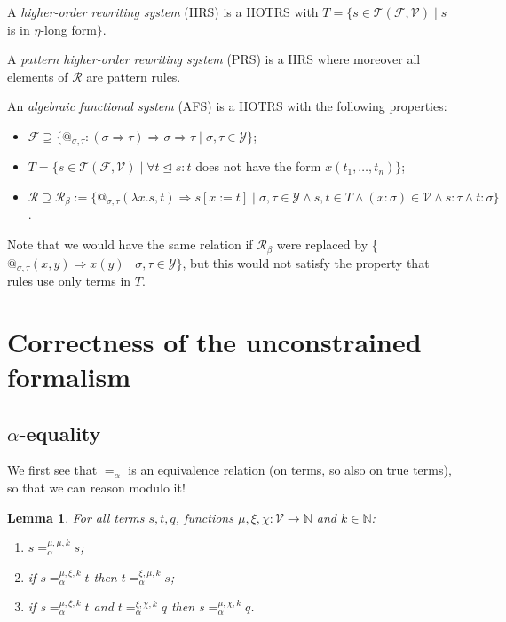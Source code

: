 \documentclass{lmcs}
\theoremstyle{theorem}\newtheorem{theorem}{Theorem}
\theoremstyle{theorem}\newtheorem{lemma}[theorem]{Lemma}
\theoremstyle{theorem}\newtheorem{corollary}[theorem]{Corollary}
\theoremstyle{definition}\newtheorem{definition}[theorem]{Definition}
\theoremstyle{definition}\newtheorem{example}[theorem]{Example}
\newcommand{\N}{\mathbb{N}}
\newcommand{\F}{\mathcal{F}}
\newcommand{\V}{\mathcal{V}}
\newcommand{\Types}{\mathcal{Y}}
\newcommand{\Terms}{\mathcal{T}}
\newcommand{\Rules}{\mathcal{R}}
\newcommand{\avar}{x}
\newcommand{\bvar}{y}
\newcommand{\abs}[2]{\lambda #1.#2}
\newcommand{\arrtype}{\Rightarrow}
\newcommand{\arrz}{\Rightarrow}
\newcommand{\subtermeq}{\unlhd}
\begin{document}
A \emph{higher-order rewriting system} (HRS) is a HOTRS with $T = \{ s \in \Terms(\F,\V) \mid s$
is in $\eta$-long form$\}$.

A \emph{pattern higher-order rewriting system} (PRS) is a HRS where moreover all elements of
$\Rules$ are pattern rules.

An \emph{algebraic functional system} (AFS) is a HOTRS with the following properties:
\begin{itemize}
\item $\F \supseteq \{ @_{\sigma,\tau} : (\sigma \arrtype \tau) \arrtype \sigma \arrtype \tau
  \mid \sigma,\tau \in \Types \}$;
\item $T = \{ s \in \Terms(\F,\V) \mid \forall t \subtermeq s: t$ does not have the form
  $\avar(t_1,\dots,t_n)\}$;
\item $\Rules \supseteq \Rules_\beta := \{ @_{\sigma,\tau}(\abs{\avar}{s},t) \arrz s[\avar:=t] \mid
  \sigma,\tau \in \Types \wedge s,t \in T \wedge (\avar : \sigma) \in \V \wedge s : \tau \wedge
  t : \sigma \}$.
\end{itemize}
Note that we would have the same relation if $\Rules_\beta$ were replaced by \{
$@_{\sigma,\tau}(\avar,\bvar) \arrz \avar(\bvar) \mid \sigma,\tau \in \Types \}$, but this would not
satisfy the property that rules use only terms in $T$.

\newpage\appendix

\section{Correctness of the unconstrained formalism}

\subsection{$\alpha$-equality}

We first see that $=_\alpha$ is an equivalence relation (on terms, so also on true terms), so that
we can reason modulo it!

\begin{lemma}\label{lem:alphaequiv}
For all terms $s,t,q$, functions $\mu,\xi,\chi : \V \to \N$ and $k \in \N$:
\begin{enumerate}
\item\label{lem:alphaequiv:reflexive}
  $s =_\alpha^{\mu,\mu,k} s$;
\item\label{lem:alphaequiv:symmetric}
  if $s =_\alpha^{\mu,\xi,k} t$ then $t =_\alpha^{\xi,\mu,k} s$;
\item\label{lem:alphaequiv:transitive}
  if $s =_\alpha^{\mu,\xi,k} t$ and $t =_\alpha^{\xi,\chi,k} q$ then $s =_\alpha^{\mu,\chi,k} q$.
\end{enumerate}
\end{lemma}
\end{document}
